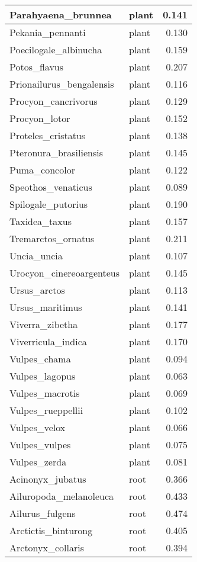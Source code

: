 \begin{table}
\begin{tabular}[t]{l|l|r}
Parahyaena\_brunnea & plant & 0.141\\
\hline
Pekania\_pennanti & plant & 0.130\\
\hline
Poecilogale\_albinucha & plant & 0.159\\
\hline
Potos\_flavus & plant & 0.207\\
\hline
Prionailurus\_bengalensis & plant & 0.116\\
\hline
Procyon\_cancrivorus & plant & 0.129\\
\hline
Procyon\_lotor & plant & 0.152\\
\hline
Proteles\_cristatus & plant & 0.138\\
\hline
Pteronura\_brasiliensis & plant & 0.145\\
\hline
Puma\_concolor & plant & 0.122\\
\hline
Speothos\_venaticus & plant & 0.089\\
\hline
Spilogale\_putorius & plant & 0.190\\
\hline
Taxidea\_taxus & plant & 0.157\\
\hline
Tremarctos\_ornatus & plant & 0.211\\
\hline
Uncia\_uncia & plant & 0.107\\
\hline
Urocyon\_cinereoargenteus & plant & 0.145\\
\hline
Ursus\_arctos & plant & 0.113\\
\hline
Ursus\_maritimus & plant & 0.141\\
\hline
Viverra\_zibetha & plant & 0.177\\
\hline
Viverricula\_indica & plant & 0.170\\
\hline
Vulpes\_chama & plant & 0.094\\
\hline
Vulpes\_lagopus & plant & 0.063\\
\hline
Vulpes\_macrotis & plant & 0.069\\
\hline
Vulpes\_rueppellii & plant & 0.102\\
\hline
Vulpes\_velox & plant & 0.066\\
\hline
Vulpes\_vulpes & plant & 0.075\\
\hline
Vulpes\_zerda & plant & 0.081\\
\hline
Acinonyx\_jubatus & root & 0.366\\
\hline
Ailuropoda\_melanoleuca & root & 0.433\\
\hline
Ailurus\_fulgens & root & 0.474\\
\hline
Arctictis\_binturong & root & 0.405\\
\hline
Arctonyx\_collaris & root & 0.394\\

\end{tabular}
\end{table}
